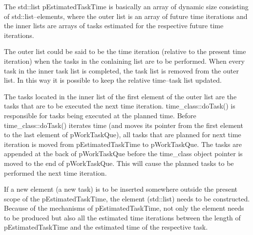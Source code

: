	The std::list pEstimatedTaskTime is basically an array of dynamic size consisting of std::list--elements,
	where the outer list is an array of future time iterations and the inner lists are arrays of tasks estimated for the respective future time iterations.

	The outer list could be said to be the time iteration (relative to the present time iteration) when the tasks in the conlaining list are to be performed. 
	When every task in the inner task list is completed, %
		the task list is removed from the outer list. 
	In this way it is possible to keep the relative time--task list updated.

	The tasks located in the inner list of the first element of the outer list are the tasks that are to be executed the next time iteration.
	time\_class::doTask() is responsible for tasks being executed at the planned time. 
	Before time\_class::doTask() iterates time (and moves its pointer from the first element to the last element of pWorkTaskQue), all tasks that are planned for next time iteration is moved from pEstimatedTaskTime to pWorkTaskQue.
	The tasks are appended at the back of pWorkTaskQue before the time\_class object pointer is moved to the end of pWorkTaskQue. 
	This will cause the planned tasks to be performed the next time iteration.


	If a new element (a new task) is to be inserted somewhere outside the present scope of the pEstimatedTaskTime, the element (std::list) needs to be constructed.
	Because of the mechanisms of pEstimatedTaskTime, not only the element needs to be produced but also all the estimated time iterations between the length of pEstimatedTaskTime and the estimated time of the respective task.

	
